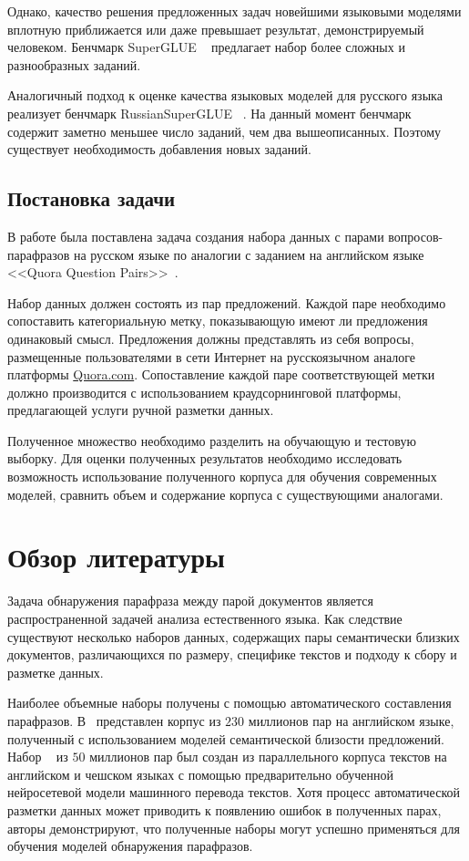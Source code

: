 \documentclass[a4paper,14pt]{extarticle}
\begin{document}
Однако, качество решения предложенных задач новейшими языковыми моделями вплотную приближается или даже превышает результат, демонстрируемый человеком.
Бенчмарк SuperGLUE ~\autocite{wang2019superglue} предлагает набор более сложных и разнообразных заданий.

Аналогичный подход к оценке качества языковых моделей для русского языка реализует бенчмарк RussianSuperGLUE ~\autocite{shavrina2020russiansuperglue}.
На данный момент бенчмарк содержит заметно меньшее число заданий, чем два вышеописанных.
Поэтому существует необходимость добавления новых заданий.

\subsection{Постановка задачи}

В работе была поставлена задача создания набора данных с парами вопросов-парафразов на русском языке по аналогии с заданием на английском языке {<<Quora Question Pairs>>}~\autocite{iyer_csernai_dandekar_2017}.

Набор данных должен состоять из пар предложений. Каждой паре необходимо сопоставить категориальную метку, показывающую имеют ли предложения одинаковый смысл.
Предложения должны представлять из себя вопросы, размещенные пользователями в сети Интернет на русскоязычном аналоге платформы \href{https://www.quora.com/}{Quora.com}.
Сопоставление каждой паре соответствующей метки должно производится с использованием краудсорнинговой платформы, предлагающей услуги ручной разметки данных.

Полученное множество необходимо разделить на обучающую и тестовую выборку.
Для оценки полученных результатов необходимо исследовать возможность использование полученного корпуса для обучения современных моделей, сравнить объем и содержание корпуса с существующими аналогами.

\section{Обзор литературы}

Задача обнаружения парафраза между парой документов является распространенной задачей анализа естественного языка.
Как следствие существуют несколько наборов данных, содержащих пары семантически близких документов, различающихся по размеру, специфике текстов и подходу к сбору и разметке данных.

Наиболее объемные наборы получены с помощью автоматического составления парафразов.
В~\autocite{ganitkevitch2013ppdb} представлен корпус из $230$ миллионов пар на английском языке, полученный с использованием моделей семантической близости предложений.
Набор ~\autocite{wieting2017paranmt} из $50$ миллионов пар был создан из параллельного корпуса текстов на английском и чешском языках с помощью предварительно обученной нейросетевой модели машинного перевода текстов.
Хотя процесс автоматической разметки данных может приводить к появлению ошибок в полученных парах, авторы демонстрируют, что полученные наборы могут успешно применяться для обучения моделей обнаружения парафразов.
\end{document}
